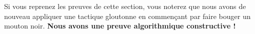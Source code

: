 \begin{remark}
	Si vous reprenez les preuves de cette section, vous noterez que nous avons de nouveau appliquer une tactique gloutonne en commençant par faire bouger un mouton noir. \textbf{Nous avons une preuve algorithmique constructive !}
\end{remark}

